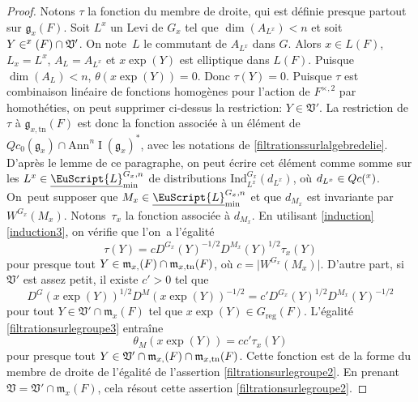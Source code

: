 \documentclass[JEP,XML,SOM,Unicode,francais]{cedram}
\let\mathcal \EuScript
\newcommand{\NoChangel}[1]{%
\expandafter\let\csname old\string#1\endcsname=#1
\let#1=\relax
\newcommand{#1}{\mathcode`l="716C\csname old\string#1\endcsname\mathcode`l="7160 }%
}
\newcommand{\frg}{\mathfrak{g}}
\newcommand{\frl}{\mathfrak{l}}\NoChangel{\frl}
\newcommand{\mfrm}{\mathfrak{m}}
\newcommand{\frV}{\mathfrak{V}}
\newcommand{\Ann}{\mathrm{Ann}}
\newcommand{\rell}{\mathrm{ell}} \NoChangel{\rell}
\newcommand{\Ind}{\mathrm{Ind}}
\newcommand{\reg}{\mathrm{reg}}
\newcommand{\tn}{\mathrm{tn}}
\DeclareMathOperator{\rI}{I}
\newcommand{\cL}{\mathcal{L}}
\theoremstyle{plain}
\theoremstyle{definition}
\begin{document}
\begin{proof}
Notons $\tau$ la fonction du membre de droite, qui est définie presque partout sur $\frg_{x}(F)$.
Soit $L^x$ un Levi de $G_{x}$ tel que $\dim(A_{L^x})<n$ et soit $Y\in \frl^x_{\rell}(F)\cap \frV'$. On note~$L$ le commutant de $A_{L^x}$ dans $G$. Alors $x\in L(F)$, $L_{x}=L^x$, $A_{L}=A_{L^x}$ et $x \exp(Y)$ est elliptique dans $L(F)$. Puisque $\dim(A_{L})<n$, $\theta(x \exp(Y))=0$. Donc $\tau(Y)=0$. Puisque $\tau$ est combinaison linéaire de fonctions homogènes pour l'action de $F^{\times,2}$ par homothéties, on peut supprimer ci-dessus la restriction: $Y\in \frV'$. La restriction de $\tau$ à $\frg_{x,\tn}(F)$ est donc la fonction associée à un élément de $Qc_{0}(\frg_{x})\cap \Ann^{n}\rI(\frg_{x})^*$, avec les notations de \ref{filtrationssurlalgebredelie}. D'après le lemme de ce paragraphe, on peut écrire cet élément comme somme sur les $L^x\in \underline{\cL}_{\min}^{G_{x},n}$ de distributions $\Ind_{L^x}^{G_{x}}(d_{L^x})$, où $d_{L^x}\in Qc(\frl^x)$. On~peut supposer que $M_{x}\in \underline{\cL}_{\min}^{G_{x},n}$ et que $d_{M_{x}}$ est invariante par $ W^{G_{x}}(M_{x})$. Notons~$\tau_{x}$ la fonction associée à $d_{M_{x}}$. En utilisant \ref{induction}\,\eqref{induction3}, on vérifie que l'on~a l'égalité
\[
\tau(Y)=cD^{G_{x}}(Y)^{-1/2}D^{M_{x}}(Y)^{1/2}\tau_{x}(Y)
\]
pour presque tout $Y\in
\mfrm_{x,\rell}(F)\cap \mfrm_{x,\tn}(F)$, où $c=\vert W^{G_{x}}(M_{x})\vert $. D'autre part, si $\frV'$ est assez petit, il existe $c'>0$ tel que
\[
D^G(x \exp(Y))^{1/2}D^M(x \exp(Y))^{-1/2}=c'D^{G_{x}}(Y)^{1/2}D^{M_{x}}(Y)^{-1/2}
\]
pour tout $Y\in \frV'\cap \mfrm_{x}(F)$ tel que $x \exp(Y)\in G_{\reg}(F)$. L'égalité \eqref{filtrationsurlegroupe3} entraîne
\[
\theta_{M}(x \exp(Y))=cc'\tau_{x}(Y)
\]
pour presque tout $Y\in
\frV'\cap\mfrm_{x,\rell}(F)\cap \mfrm_{x,\tn}(F)$.
Cette fonction est de la forme du membre de droite de l'égalité de l'assertion \eqref{filtrationsurlegroupe2}. En prenant $\frV=\frV'\cap \mfrm_{x}(F)$, cela résout cette assertion \eqref{filtrationsurlegroupe2}.


\end{proof}
\end{document}
